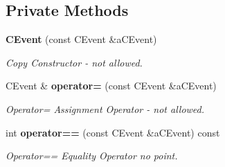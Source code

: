 \subsection*{Private Methods}
\begin{CompactItemize}
\item 
{\bf CEvent} (const CEvent \&a\-CEvent)
\begin{CompactList}\small\item\em Copy Constructor - not allowed.\item\end{CompactList}\item 
CEvent \& {\bf operator=} (const CEvent \&a\-CEvent)
\begin{CompactList}\small\item\em Operator= Assignment Operator - not allowed.\item\end{CompactList}\item 
int {\bf operator==} (const CEvent \&a\-CEvent) const
\begin{CompactList}\small\item\em Operator== Equality Operator no point.\item\end{CompactList}\end{CompactItemize}
